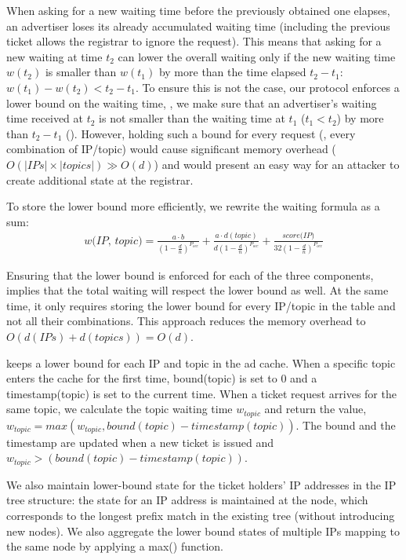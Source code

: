 When asking for a new waiting time before the previously obtained one elapses,
an advertiser loses its already accumulated waiting time (including the previous ticket allows the registrar to ignore the request). This means that asking for a new waiting at time $t_2$ can lower the overall waiting only if
the new waiting time $w(t_2)$ is smaller than $w(t_1)$ by more than the time elapsed $t_2 - t_1$: $w(t_1) - w(t_2) < t_2 - t_1$.
To ensure this is not the case, our protocol enforces a lower bound on the
waiting time, \ie, we make sure that an advertiser's waiting time received at
$t_2$ is not smaller than the waiting time at $t_1$ ($t_1 < t_2$) by more than
$t_2 - t_1$ ().
However, holding such a bound for every request (\ie, every combination of IP/topic) would cause significant memory overhead ($O(|\textit{IPs}|\times|\textit{topics}|) \gg O(d)$) and would present an easy way for an attacker to create additional state at the registrar. 

To store the lower bound more efficiently, we rewrite the waiting formula as a sum:
\begin{equation}
\begin{split}
    \textit{w(IP, topic)} = 
    \frac{a\cdot b}{(1-\frac{d}{n})^{P_\textit{occ}}} + \frac{a\cdot d(\textit{topic})}{d(1-\frac{d}{n})^{P_\textit{occ}}} + \frac{\textit{score(IP)}}{32(1-\frac{d}{n})^{P_\textit{occ}}}
\end{split}
\end{equation}


Ensuring that the lower bound is enforced for each of the three components, implies that the total waiting will respect the lower bound as well. At the same time, it only requires storing the lower bound for every IP/topic in the table and not all their combinations. This approach reduces the memory overhead to $O(d(IPs)+d(topics)) = O(d)$.

\sysname keeps a lower bound for each IP and topic in the ad cache. When a specific topic enters the cache for the first time, bound(topic) is set to 0 and a timestamp(topic) is set to the current time. When a ticket request arrives for the same topic, we calculate the topic waiting time $w_{\textit{topic}}$ and return the value, $w_{\textit{topic}} = \textit{max}(w_{\textit{topic}}, \textit{bound}(\textit{topic}) - \textit{timestamp}(\textit{topic}))$. The bound and the timestamp are updated when a new ticket is issued and $w_{\textit{topic}} > (\textit{bound}(\textit{topic}) - \textit{timestamp}(\textit{topic}))$. 

We also maintain lower-bound state for the ticket holders' IP addresses in the IP tree structure: the state for an IP address is maintained at the node, which corresponds to the longest prefix match in the existing tree (without introducing new nodes). We also aggregate the lower bound states of multiple IPs mapping to the same node by applying a max() function.  


